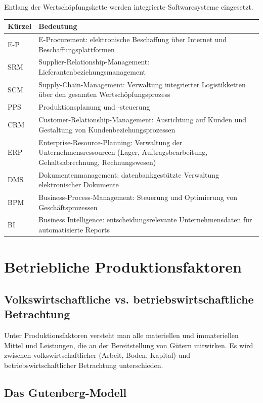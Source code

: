 \documentclass[11pt, a4paper]{article}
\begin{document}
Entlang der Wertschöpfungskette werden integrierte Softwaresysteme eingesetzt.

\begin{center}
\begin{tabular}{p{1.5cm} p{11.5cm}}
\toprule
\textbf{Kürzel} & \textbf{Bedeutung}\\
\midrule
E-P & E-Procurement: elektronische Beschaffung über Internet und Beschaffungsplattformen\\
SRM & Supplier-Relationship-Management: Lieferantenbeziehungsmanagement\\
SCM & Supply-Chain-Management: Verwaltung integrierter Logistikketten über den gesamten Wertschöpfungsprozess\\
PPS & Produktionsplanung und -steuerung\\
CRM & Customer-Relationship-Management: Ausrichtung auf Kunden und Gestaltung von Kundenbeziehungsprozessen\\
ERP & Enterprise-Resource-Planning: Verwaltung der Unternehmensressourcen (Lager, Auftragsbearbeitung, Gehaltsabrechnung, Rechnungswesen)\\
DMS & Dokumentenmanagement: datenbankgestützte Verwaltung elektronischer Dokumente\\
BPM & Business-Process-Management: Steuerung und Optimierung von Geschäftsprozessen\\
BI & Business Intelligence: entscheidungsrelevante Unternehmensdaten für automatisierte Reports\\
\bottomrule
\end{tabular}
\end{center}

\section{Betriebliche Produktionsfaktoren}

\subsection{Volkswirtschaftliche vs. betriebswirtschaftliche Betrachtung}

Unter Produktionsfaktoren versteht man alle materiellen und immateriellen Mittel und Leistungen,
die an der Bereitstellung von Gütern mitwirken. Es wird zwischen volkswirtschaftlicher
(Arbeit, Boden, Kapital) und betriebswirtschaftlicher Betrachtung unterschieden.

\subsection{Das Gutenberg-Modell}
\end{document}
